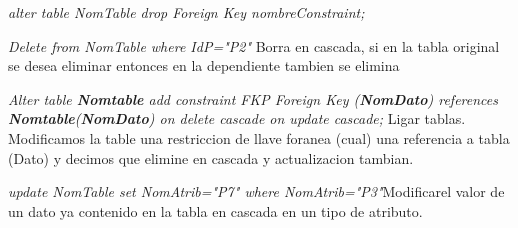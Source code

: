 \documentclass[12pt, fleqn]{report}                             %
\theoremstyle{break}                                            %
\begin{document}
	\emph{alter table NomTable drop Foreign Key nombreConstraint;}

	\emph{Delete from NomTable where IdP="P2"} Borra en cascada, si en la tabla original se desea eliminar entonces en la dependiente tambien se elimina


	\emph{Alter table \textbf{Nomtable} add constraint FKP Foreign Key (\textbf{NomDato}) references \textbf{Nomtable}(\textbf{NomDato}) on delete cascade on update cascade;} Ligar tablas. Modificamos la table una restriccion de llave foranea (cual) una referencia a tabla (Dato) y decimos que elimine en cascada y actualizacion tambian.

	\emph{update NomTable set NomAtrib="P7" where NomAtrib="P3"}Modificarel valor de un dato ya contenido en la tabla en cascada en un tipo de atributo.
	\begin{appendices}
	
	
	\end{appendices}
	
    
	
\end{document}
